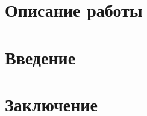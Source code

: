﻿\documentclass[a4paper,14pt]{article} %
\begin{document}
\newpage

\section*{Описание работы}
\Disk
\newpage

\tableofcontents 
\newpage

\section*{Введение}
\Intro
\newpage

\Tex
\newpage

\section*{Заключение}
\Concle
\newpage

 

\end{document}
